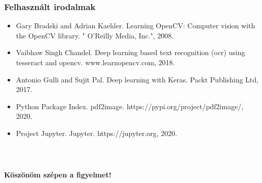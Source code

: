 \documentclass{beamer}
\begin{document}
\begin{frame}[fragile]
\frametitle{Felhasznált irodalmak}

\begin{itemize}
    \item Gary Bradski and Adrian Kaehler. Learning OpenCV: Computer vision with the OpenCV library. " O’Reilly Media, Inc.", 2008.
    \item Vaibhaw Singh Chandel. Deep learning based text recognition (ocr) using tesseract and opencv. www.learnopencv.com, 2018.
    \item Antonio Gulli and Sujit Pal. Deep learning with Keras. Packt Publishing Ltd, 2017.
    \item Python Package Index. pdf2image. https://pypi.org/project/pdf2image/, 2020.
    \item Project Jupyter. Jupyter. https://jupyter.org, 2020.
\end{itemize}

\end{frame}

\begin{frame}[fragile]
\frametitle{\ }

\begin{center}

    \Large

    \textbf{Köszönöm szépen a figyelmet!}

    \bigskip

\end{center}

\end{frame}
\end{document}
